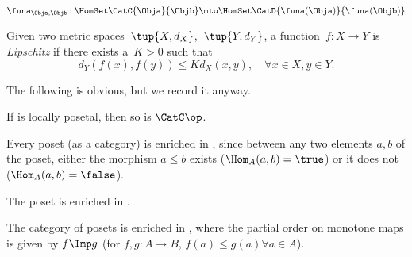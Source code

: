 {\begin{forslides}
\begin{equation*}
        \end{equation*}
        \begin{equation*}
            \label{eq:enriched_fun_a}
            \funa_{\Obja, \Objb} \colon \HomSet\CatC{\Obja}{\Objb} \mto \HomSet\CatD{\funa(\Obja)}{\funa(\Objb)}
        \end{equation*}
        \begin{definition}
            \label{def:cost_enrich_a}
            Given two metric spaces~$\tup{X,d_X}$,~$\tup{Y,d_Y}$, a function~$f\colon X\to Y$ is \emph{Lipschitz} if there exists a~$K>0$ such that
            \begin{equation}
                d_Y(f(x),f(y))\leq Kd_X(x,y),\quad \forall x\in X,y\in Y.
            \end{equation}
        \end{definition}
    \end{forslides}
}

%
The following is obvious, but we record it anyway.
\begin{lemma}
    \label{lem:loc_pos_op}
    If \CatC is locally posetal, then so is $\CatC\op$.
\end{lemma}

\begin{example}
    \label{ex:enrichbool}
    Every poset (as a category) is enriched in \Bool, since between any two elements $a,b$ of the poset, either the morphism $a \leq b$ exists ($\Hom_A(a,b) = \true$) or it does not ($\Hom_A(a,b) = \false$).
\end{example}

\begin{example}
    The poset \Bool is enriched in \Bool.
\end{example}

\begin{example}
    The category \Pos of posets is enriched in \Pos, where the partial order on monotone maps is given by $f \Imp g$ (\ie  for $f,g : A \to B$, $f(a) \leq g(a) \forall a \in A$).
\end{example}

